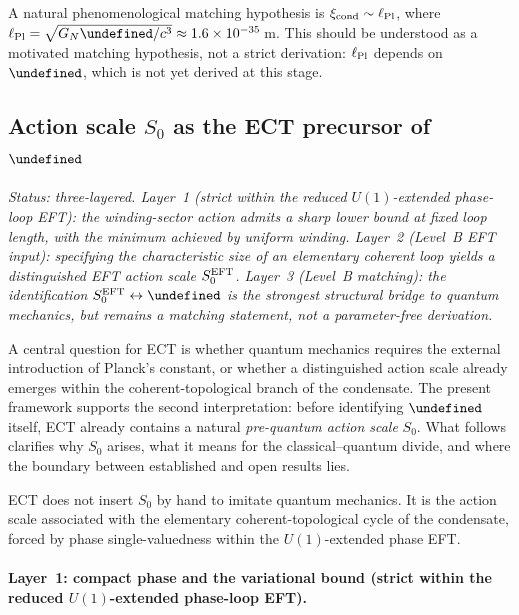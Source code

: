\documentclass[11pt,a4paper]{article}
\let\hbar\undefined
\numberwithin{equation}{section}
\begin{document}
A natural phenomenological matching hypothesis is $\xi_{\rm cond}\sim\ell_{\rm Pl}$,
where $\ell_{\rm Pl}=\sqrt{G_N\hbar/c^3}\approx 1.6\times 10^{-35}$\,m.
This should be understood as a motivated matching hypothesis,
not a strict derivation: $\ell_{\rm Pl}$ depends on~$\hbar$,
which is not yet derived at this stage.

\subsection{Action scale $S_0$ as the ECT precursor of $\hbar$}
\label{sec:hbar_status}

\textit{Status: three-layered.
Layer~1 (strict within the reduced $U(1)$-extended phase-loop EFT):
the winding-sector action admits a sharp lower bound at fixed loop
length, with the minimum achieved by uniform winding.
Layer~2 (Level~B EFT input): specifying the characteristic size of an
elementary coherent loop yields a distinguished EFT action scale
$S_0^{\rm EFT}$.
Layer~3 (Level~B matching): the identification
$S_0^{\rm EFT}\leftrightarrow\hbar$ is the strongest structural bridge
to quantum mechanics, but remains a matching statement, not a
parameter-free derivation.}

A central question for ECT is whether quantum mechanics requires the
external introduction of Planck's constant, or whether a distinguished
action scale already emerges within the coherent-topological branch of
the condensate.
The present framework supports the second interpretation:
before identifying $\hbar$ itself, ECT already contains a natural
\emph{pre-quantum action scale} $S_0$.
What follows clarifies why $S_0$ arises, what it means for the
classical--quantum divide, and where the boundary between established
and open results lies.

ECT does not insert $S_0$ by hand to imitate quantum mechanics.
It is the action scale associated with the elementary
coherent-topological cycle of the condensate, forced by phase
single-valuedness within the $U(1)$-extended phase EFT.


\paragraph{Layer~1: compact phase and the variational bound
(strict within the reduced $U(1)$-extended phase-loop EFT).}
\end{document}
